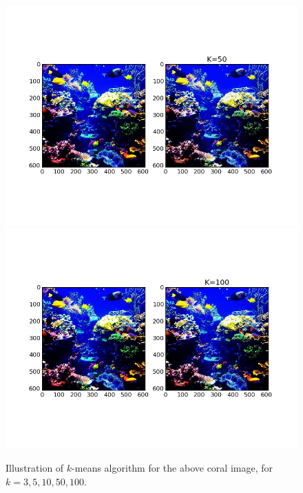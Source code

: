 \documentclass[a4paper,10pt,twoside]{article}
\begin{document}
\begin{figure}
    \includegraphics[trim = 1.5cm 3.5cm 1.5cm 3.5cm ,clip=true, width=1.0\textwidth,height=.19\textheight,keepaspectratio]{figure_2_4.png}
    \includegraphics[trim = 1.5cm 3.5cm 1.5cm 3.5cm ,clip=true, width=1.0\textwidth,height=.19\textheight,keepaspectratio]{figure_2_5.png}
  \caption{Illustration of $k$-means algorithm for the above coral image, for $k = 3, 5, 10, 50, 100$.}
  \label{fig:imagekmeans}
\end{figure}
\end{document}
